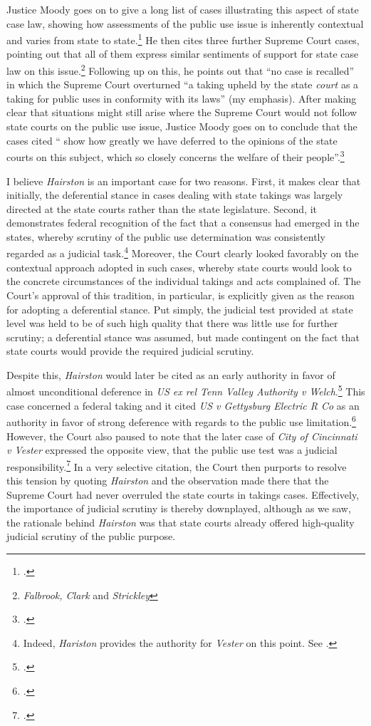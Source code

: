 Justice Moody goes on to give a long list of cases illustrating this aspect of state case law, showing how assessments of the public use issue is inherently contextual and varies from state to state.\footcite[607]{hairston08} He then cites three further Supreme Court cases, pointing out that all of them express similar sentiments of support for state case law on this issue.\footnote{{\it Falbrook, Clark} and {\it Strickley}} Following up on this, he points out that ``no case is recalled'' in which the Supreme Court overturned ``a taking upheld by the state {\it court} as a taking for public uses in conformity with its laws'' (my emphasis). After making clear that situations might still arise where the Supreme Court would not follow state courts on the public use issue, Justice Moody goes on to conclude that the cases cited `` show how greatly we have deferred to the opinions of the state courts on this subject, which so closely concerns the welfare of their people''.\footcite[606]{hairston08}

I believe {\it Hairston} is an important case for two reasons. First, it makes clear that initially, the deferential stance in cases dealing with state takings was largely directed at the state courts rather than the state legislature. Second, it demonstrates federal recognition of the fact that a consensus had emerged in the states, whereby scrutiny of the public use determination was consistently regarded as a judicial task.\footnote{Indeed, {\it Hariston} provides the authority for {\it Vester} on this point. See \cite[606]{vester30}.} Moreover, the Court clearly looked favorably on the contextual approach adopted in such cases, whereby state courts would look to the concrete circumstances of the individual takings and acts complained of. The Court's approval of this tradition, in particular, is explicitly given as the reason for adopting a deferential stance. Put simply, the judicial test provided at state level was held to be of such high quality that there was little use for further scrutiny; a deferential stance was assumed, but made contingent on the fact that state courts would provide the required judicial scrutiny.

Despite this, {\it Hairston} would later be cited as an early authority in favor of almost unconditional deference in {\it US ex rel Tenn Valley Authority v Welch}.\footcite[552]{welch46} This case concerned a federal taking and it cited {\it US v Gettysburg Electric R Co} as an authority in favor of strong deference with regards to the public use limitation.\footcite{gettysburg96} However, the Court also paused to note that the later case of {\it City of Cincinnati v Vester} expressed the opposite view, that the public use test was a judicial responsibility.\footcite{vester30} In a very selective citation, the Court then purports to resolve this tension by quoting {\it Hairston} and the observation made there that the Supreme Court had never overruled the state courts in takings cases. Effectively, the importance of judicial scrutiny is thereby downplayed, although as we saw, the rationale behind {\it Hairston} was that state courts already offered high-quality judicial scrutiny of the public purpose.

